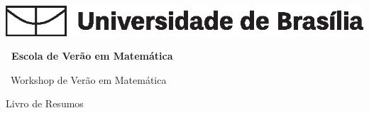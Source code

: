 \thispagestyle{empty}

$\qquad$
\begin{flushleft}
	\includegraphics[scale=1]{obj/unb.eps}
\end{flushleft}

	\thispagestyle{empty}

\begin{center}
	
	\vspace{7cm}
	
	{\bf 
		\huge{\sc \edverao\ Escola de Ver\~{a}o em Matem\'{a}tica}\\
		
		\vspace{2cm}
		
		\huge{\sc \edworkshop\ Workshop de Ver\~{a}o em Matem\'{a}tica}}
	
	\vspace{5cm}
	
	\huge{Livro de Resumos}
	
\end{center}

	
\newpage\clearpage


